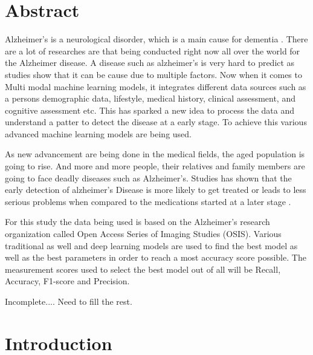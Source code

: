 \documentclass[10pt,twocolumn]{report}
\begin{document}
\chapter*{Abstract}

Alzheimer's is a neurological disorder, which is a main cause for dementia \cite{Ewers2011}. There are a lot of researches are that being conducted right now all over the world for the Alzheimer disease. A disease such as alzheimer's is very hard to predict as studies show that it can be cause due to multiple factors. Now when it comes to Multi modal machine learning models, it integrates different data sources such as a persons demographic data, lifestyle, medical history, clinical assessment, and cognitive assessment etc. This has sparked a new idea to process the data and understand a patter to detect the disease at a early stage. To achieve this various advanced machine learning models are being used.

As new advancement are being done in the medical fields, the aged population is going to rise. And more and more people, their relatives and family members are going to face deadly diseases such as Alzheimer's. Studies has shown that the early detection of alzheimer's Disease is more likely to get treated or leads to less serious problems when compared to the medications started at a later stage \cite{Cummings2024}.

For this study the data being used is based on the Alzheimer's research organization called Open Access Series of Imaging Studies (OSIS). Various traditional as well and deep learning models are used to find the best model as well as the best parameters in order to reach a most accuracy score possible. The measurement scores used to select the best model out of all will be Recall, Accuracy, F1-score and Precision. 

Incomplete.... Need to fill the rest.



\tableofcontents
\listoffigures %
\listoftables  %

\chapter{Introduction}
\end{document}

